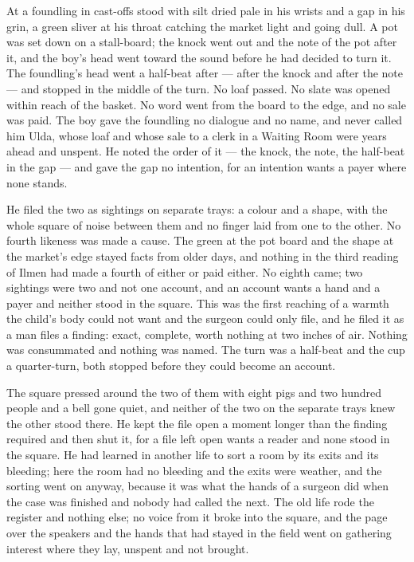 At  a foundling in cast-offs stood with silt dried pale in his wrists and a gap in his grin, a green sliver at his throat catching the market light and going dull. A pot was set down on a stall-board; the knock went out and the note of the pot after it, and the boy's head went toward the sound before he had decided to turn it. The foundling's head went a half-beat after --- after the knock and after the note --- and stopped in the middle of the turn. No loaf passed. No slate was opened within reach of the basket. No word went from the board to the edge, and no sale was paid. The boy gave the foundling no dialogue and no name, and never called him Ulda, whose loaf and whose sale to a clerk in a Waiting Room were years ahead and unspent. He noted the order of it --- the knock, the note, the half-beat in the gap --- and gave the gap no intention, for an intention wants a payer where none stands.

He filed the two as sightings on separate trays: a colour and a shape, with the whole square of noise between them and no finger laid from one to the other. No fourth likeness was made a cause. The green at the pot board and the shape at the market's edge stayed facts from older days, and nothing in the third reading of Ilmen had made a fourth of either or paid either. No eighth came; two sightings were two and not one account, and an account wants a hand and a payer and neither stood in the square. This was the first reaching of a warmth the child's body could not want and the surgeon could only file, and he filed it as a man files a finding: exact, complete, worth nothing at two inches of air. Nothing was consummated and nothing was named. The turn was a half-beat and the cup a quarter-turn, both stopped before they could become an account.

The square pressed around the two of them with eight pigs and two hundred people and a bell gone quiet, and neither of the two on the separate trays knew the other stood there. He kept the file open a moment longer than the finding required and then shut it, for a file left open wants a reader and none stood in the square. He had learned in another life to sort a room by its exits and its bleeding; here the room had no bleeding and the exits were weather, and the sorting went on anyway, because it was what the hands of a surgeon did when the case was finished and nobody had called the next. The old life rode the register and nothing else; no voice from it broke into the square, and the page over the speakers and the hands that had stayed in the field went on gathering interest where they lay, unspent and not brought.


